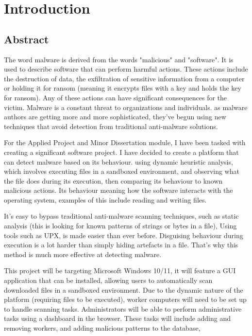 \chapter{Introduction}

\section{Abstract}
The word malware is derived from the words "malicious" and "software".
It is used to describe software that can perform harmful actions.
These actions include the destruction of data,
the exfiltration of sensitive information from a computer or
holding it for ransom (meaning it encrypts files with a key and holds the key for ransom).
Any of these actions can have significant consequences for the victim.
Malware is a constant threat to organizations and individuals.
as malware authors are getting more and more sophisticated,
they've begun using new techniques that avoid detection from traditional anti-malware solutions.

For the Applied Project and Minor Dissertation module,
I have been tasked with creating a significant software project.
I have decided to create a platform that can detect malware based on its behaviour.
using dynamic heuristic analysis, which involves executing files in a sandboxed environment,
and observing what the file does during its execution,
then comparing its behaviour to known malicious actions.
Its behaviour meaning how the software interacts with the operating system,
examples of this include reading and writing files.

It's easy to bypass traditional anti-malware scanning techniques,
such as static analysis (this is looking for known patterns of strings or bytes in a file),
Using tools such as UPX, is made easier than ever before.
Disguising behaviour during execution is a lot harder than simply hiding artefacts in a file.
That's why this method is much more effective at detecting malware.

This project will be targeting Microsoft Windows 10/11,
it will feature a GUI application that can be installed,
allowing users to automatically scan downloaded files in a sandboxed environment.
Due to the dynamic nature of the platform (requiring files to be executed),
worker computers will need to be set up to handle scanning tasks.
Administrators will be able to perform administrative tasks using a dashboard in the browser.
These tasks will include adding and removing workers,
and adding malicious patterns to the database,

